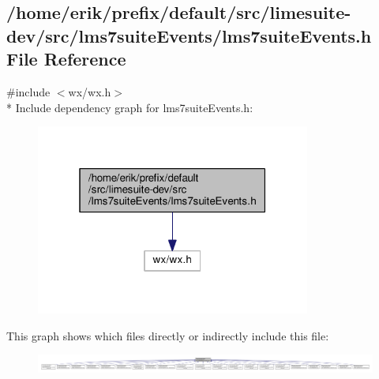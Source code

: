 \subsection{/home/erik/prefix/default/src/limesuite-\/dev/src/lms7suite\+Events/lms7suite\+Events.h File Reference}
\label{lms7suiteEvents_8h}
{\ttfamily \#include $<$wx/wx.\+h$>$}\\*
Include dependency graph for lms7suite\+Events.\+h\+:
\nopagebreak
\begin{figure}[H]
\begin{center}
\leavevmode
\includegraphics[width=256pt]{d9/df2/lms7suiteEvents_8h__incl}
\end{center}
\end{figure}
This graph shows which files directly or indirectly include this file\+:
\nopagebreak
\begin{figure}[H]
\begin{center}
\leavevmode
\includegraphics[width=350pt]{d3/df3/lms7suiteEvents_8h__dep__incl}
\end{center}
\end{figure}
